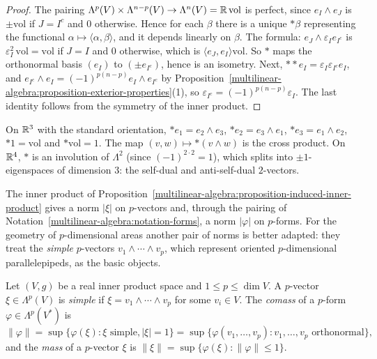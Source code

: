 \begin{proof}
The pairing $\Lambda^p(V) \times \Lambda^{n-p}(V) \to \Lambda^n(V) = \mathbb{R}\,\mathrm{vol}$ is perfect, since $e_I \wedge e_J$ is
$\pm\mathrm{vol}$ if $J = I^c$ and $0$ otherwise. Hence for each $\beta$ there is a unique $*\beta$ representing the functional
$\alpha \mapsto \langle \alpha, \beta \rangle$, and it depends linearly on $\beta$. The formula: $e_J \wedge \varepsilon_I e_{I^c}$ is
$\varepsilon_I^2\,\mathrm{vol} = \mathrm{vol}$ if $J = I$ and $0$ otherwise, which is $\langle e_J, e_I \rangle\mathrm{vol}$. So $*$ maps the
orthonormal basis $(e_I)$ to $(\pm e_{I^c})$, hence is an isometry. Next,
$**e_I = \varepsilon_I\varepsilon_{I^c}e_I$, and $e_{I^c} \wedge e_I = (-1)^{p(n-p)}e_I \wedge e_{I^c}$ by
Proposition~\ref{multilinear-algebra:proposition-exterior-properties}(1), so
$\varepsilon_{I^c} = (-1)^{p(n-p)}\varepsilon_I$. The last identity follows from the symmetry of the inner product.
\end{proof}

\begin{example}\label{multilinear-algebra:example-star-r3}
On $\mathbb{R}^3$ with the standard orientation, $*e_1 = e_2 \wedge e_3$, $*e_2 = e_3 \wedge e_1$, $*e_3 = e_1 \wedge e_2$,
$*1 = \mathrm{vol}$ and $*\mathrm{vol} = 1$. The map $(v, w) \mapsto *(v \wedge w)$ is the cross product. On $\mathbb{R}^4$, $*$ is an
involution of $\Lambda^2$ (since $(-1)^{2 \cdot 2} = 1$), which splits into $\pm 1$-eigenspaces of dimension $3$: the self-dual
and anti-self-dual $2$-vectors.
\end{example}

The inner product of Proposition~\ref{multilinear-algebra:proposition-induced-inner-product} gives a norm $|\xi|$ on $p$-vectors and, through the pairing of Notation~\ref{multilinear-algebra:notation-forms}, a norm $|\varphi|$ on
$p$-forms. For the geometry of $p$-dimensional areas another pair of norms is better adapted: they treat the \emph{simple} $p$-vectors $v_1 \wedge \cdots \wedge v_p$, which represent oriented $p$-dimensional
parallelepipeds, as the basic objects.

\begin{definition}\label{multilinear-algebra:definition-comass}
Let $(V, g)$ be a real inner product space and $1 \leq p \leq \dim V$. A $p$-vector $\xi \in \Lambda^p(V)$ is \emph{simple} if $\xi = v_1 \wedge \cdots \wedge v_p$ for some $v_i \in V$. The \emph{comass} of a $p$-form
$\varphi \in \Lambda^p(V^*)$ is
\[
\|\varphi\| = \sup\{\varphi(\xi) : \xi \text{ simple}, |\xi| = 1\} = \sup\{\varphi(v_1, \ldots, v_p) : v_1, \ldots, v_p \text{ orthonormal}\},
\]
and the \emph{mass} of a $p$-vector $\xi$ is $\|\xi\| = \sup\{\varphi(\xi) : \|\varphi\| \leq 1\}$.
\end{definition}

